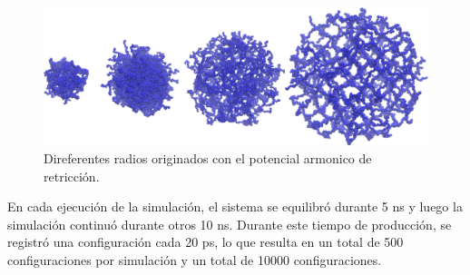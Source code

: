 \begin{figure}[!ht]
	\centering
	\includegraphics[width=0.5\linewidth]{Figures/graph-anexos/geles_radios.png}
	\caption{Direferentes radios originados con el potencial armonico de retricción. }
	\label{fig:anexo:geles}
\end{figure}



En cada ejecuci\'on de la simulaci\'on, el sistema se equilibr\'o durante 5 ns y luego la simulaci\'on continu\'o durante otros 10 ns. Durante este tiempo de producci\'on, se registr\'o una configuraci\'on cada 20 ps, lo que resulta en un total de 500 configuraciones por simulaci\'on y un total de 10000 configuraciones.
